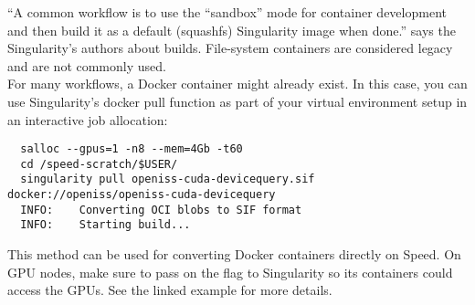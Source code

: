 \noindent ``A common workflow is to use the ``sandbox'' mode for container development and then build it as a 
default (squashfs) Singularity image when done.'' says the Singularity's authors about builds.
File-system containers are considered legacy and are not commonly used.\\

For many workflows, a Docker container might already exist. In this case, you can use Singularity's 
docker pull function as part of your virtual environment setup in an interactive job allocation:

\small
\begin{verbatim}
  salloc --gpus=1 -n8 --mem=4Gb -t60
  cd /speed-scratch/$USER/
  singularity pull openiss-cuda-devicequery.sif docker://openiss/openiss-cuda-devicequery
  INFO:    Converting OCI blobs to SIF format
  INFO:    Starting build...
\end{verbatim}
\normalsize

\noindent This method can be used for converting Docker containers directly on Speed.
On GPU nodes, make sure to pass on the  flag to Singularity so its containers 
could access the GPUs. See the linked example for more details.
